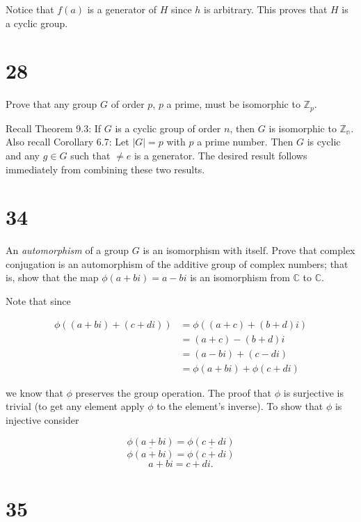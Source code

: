 \documentclass[a4paper]{article}
\begin{document}
Notice that $f(a)$ is a generator of $H$ since $h$ is arbitrary. This proves that $H$ is a cyclic group.


\section*{28}

Prove that any group $G$ of order $p$, $p$ a prime, must be isomorphic to $\mathbb{Z}_p$.

\vspace{\baselineskip}

Recall Theorem 9.3: If $G$ is a cyclic group of order $n$, then $G$ is isomorphic to $\mathbb{Z_n}$. Also recall Corollary 6.7: Let $|G| = p$ with $p$ a prime number. Then $G$ is cyclic and any $g \in G$ such that $ \neq e$ is a generator. The desired result follows immediately from combining these two results.


\section*{34}

An \textit{automorphism} of a group $G$ is an isomorphism with itself. Prove that complex conjugation is an automorphism of the additive group of complex numbers; that is, show that the map $\phi(a+bi) = a - bi$ is an isomorphism from $\mathbb{C}$ to $\mathbb{C}$.

\vspace{\baselineskip}

Note that since

\begin{align*}
\phi((a+bi) + (c+di)) &= \phi((a+c) + (b+d)i) \\
&= (a+c) - (b+d)i \\
&= (a-bi) + (c-di) \\
&= \phi(a+bi) + \phi(c+di)
\end{align*}

we know that $\phi$ preserves the group operation. The proof that $\phi$ is surjective is trivial (to get any element apply $\phi$ to the element's inverse). To show that $\phi$ is injective consider

$$\phi(a+bi) = \phi(c+di)$$
$$\overline{\phi(a+bi)} = \overline{\phi(c+di)}$$
$$a + bi = c + di.$$


\section*{35}
\end{document}
